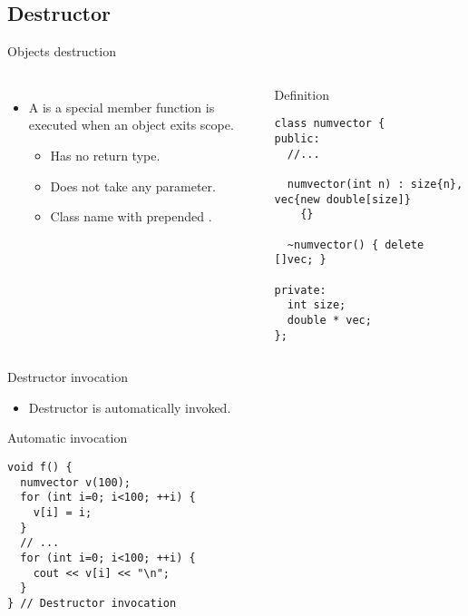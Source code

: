 \subsection{Destructor}

\begin{frame}[t,fragile]{Objects destruction}
\begin{columns}[T]

\begin{itemize}
  \item A  is a special member function is executed
         when an object exits scope.
    \begin{itemize}
      \item Has no return type.
      \item Does not take any parameter.
      \item Class name with prepended \textbf{\cppid{~}}.
    \end{itemize}
\end{itemize}


\begin{block}{Definition}
\begin{lstlisting}
class numvector {
public:
  //...

  numvector(int n) : size{n}, vec{new double[size]}
    {}

  ~numvector() { delete []vec; }

private:
  int size;
  double * vec;
};
\end{lstlisting}
\end{block}

\end{columns}
\end{frame}

\begin{frame}[t,fragile]{Destructor invocation}
\begin{itemize}
  \item Destructor is automatically invoked.
\end{itemize}

\begin{block}{Automatic invocation}
\begin{lstlisting}
void f() {
  numvector v(100);
  for (int i=0; i<100; ++i) {
    v[i] = i;
  }
  // ...
  for (int i=0; i<100; ++i) {
    cout << v[i] << "\n";
  }
} // Destructor invocation
\end{lstlisting}
\end{block}
\end{frame}
